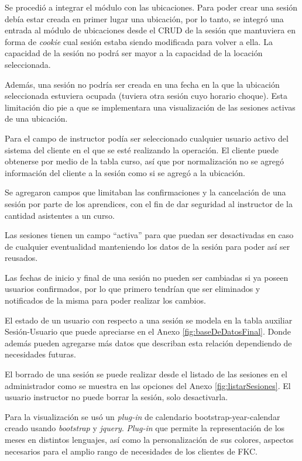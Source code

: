 	Se procedió a integrar el módulo con las ubicaciones. Para poder crear una sesión debía estar creada en primer lugar una ubicación, por lo tanto, se integró una entrada al módulo de ubicaciones desde el \gls{CRUD} de la sesión que mantuviera en forma de \emph{cookie} cual sesión estaba siendo modificada para volver a ella. La capacidad de la sesión no podrá ser mayor a la capacidad de la locación seleccionada.

	Además, una sesión no podría ser creada en una fecha en la que la ubicación seleccionada estuviera ocupada (tuviera otra sesión cuyo horario choque). Esta limitación dio pie a que se implementara una visualización de las sesiones activas de una ubicación.

	Para el campo de instructor podía ser seleccionado cualquier usuario activo del sistema del cliente en el que se esté realizando la operación. El cliente puede obtenerse por medio de la tabla curso, así que por normalización no se agregó información del cliente a la sesión como si se agregó a la ubicación.

	Se agregaron campos que limitaban las confirmaciones y la cancelación de una sesión por parte de los aprendices, con el fin de dar seguridad al instructor de la cantidad asistentes a un curso.

	Las sesiones tienen un campo ``activa'' para que puedan ser desactivadas en caso de cualquier eventualidad manteniendo los datos de la sesión para poder así ser reusados.

	Las fechas de inicio y final de una sesión no pueden ser cambiadas si ya poseen usuarios confirmados, por lo que primero tendrían que ser eliminados y notificados de la misma para poder realizar los cambios.

	El estado de un usuario con respecto a una sesión se modela en la tabla auxiliar Sesión-Usuario que puede apreciarse en el Anexo \ref{fig:baseDeDatosFinal}. Donde además pueden agregarse más datos que describan esta relación dependiendo de necesidades futuras.

	El borrado de una sesión se puede realizar desde el listado de las sesiones en el administrador como se muestra en las opciones del Anexo \ref{fig:listarSesiones}. El usuario instructor no puede borrar la sesión, solo desactivarla.

	Para la visualización se usó un \emph{plug-in} de calendario bootstrap-year-calendar creado usando \emph{bootstrap} y \emph{jquery}. \emph{Plug-in} que permite la representación de los meses en distintos lenguajes, así como la personalización de sus colores, aspectos necesarios para el amplio rango de necesidades de los clientes de FKC.

